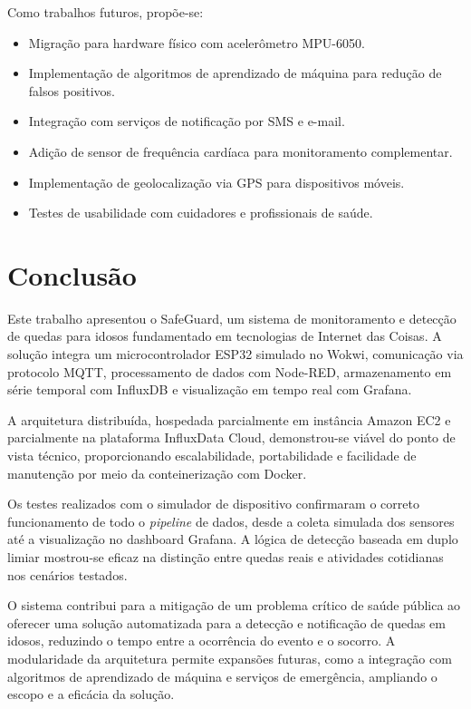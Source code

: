 \documentclass[a4paper,12pt]{article}
\begin{document}
Como trabalhos futuros, propõe-se:

\begin{itemize}[leftmargin=2cm]
    \item Migração para hardware físico com acelerômetro MPU-6050.
    \item Implementação de algoritmos de aprendizado de máquina para redução de falsos positivos.
    \item Integração com serviços de notificação por SMS e e-mail.
    \item Adição de sensor de frequência cardíaca para monitoramento complementar.
    \item Implementação de geolocalização via GPS para dispositivos móveis.
    \item Testes de usabilidade com cuidadores e profissionais de saúde.
\end{itemize}

\section{Conclusão}

Este trabalho apresentou o SafeGuard, um sistema de monitoramento e detecção de quedas para idosos fundamentado em tecnologias de Internet das Coisas. A solução integra um microcontrolador ESP32 simulado no Wokwi, comunicação via protocolo MQTT, processamento de dados com Node-RED, armazenamento em série temporal com InfluxDB e visualização em tempo real com Grafana.

A arquitetura distribuída, hospedada parcialmente em instância Amazon EC2 e parcialmente na plataforma InfluxData Cloud, demonstrou-se viável do ponto de vista técnico, proporcionando escalabilidade, portabilidade e facilidade de manutenção por meio da conteinerização com Docker.

Os testes realizados com o simulador de dispositivo confirmaram o correto funcionamento de todo o \textit{pipeline} de dados, desde a coleta simulada dos sensores até a visualização no dashboard Grafana. A lógica de detecção baseada em duplo limiar mostrou-se eficaz na distinção entre quedas reais e atividades cotidianas nos cenários testados.

O sistema contribui para a mitigação de um problema crítico de saúde pública ao oferecer uma solução automatizada para a detecção e notificação de quedas em idosos, reduzindo o tempo entre a ocorrência do evento e o socorro. A modularidade da arquitetura permite expansões futuras, como a integração com algoritmos de aprendizado de máquina e serviços de emergência, ampliando o escopo e a eficácia da solução.
\end{document}
